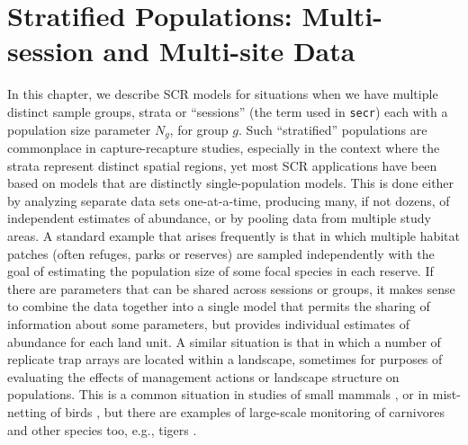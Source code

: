 \chapter{Stratified Populations:
Multi-session and Multi-site Data}
\label{chapt.hscr}

\vspace{0.3cm}


In this chapter, we describe SCR models for situations when we have
multiple distinct sample groups, strata or ``sessions'' (the term used
in \mbox{\tt secr}) each with a population size parameter $N_{g}$, for
group $g$.
Such ``stratified'' populations are commonplace in capture-recapture
studies, especially in the context where the strata represent
distinct spatial regions, yet most SCR applications have been based
 on models that are distinctly single-population models. This is done
 either by analyzing separate data sets one-at-a-time, producing many,
 if not dozens, of independent estimates of abundance, or by pooling
 data from multiple study areas.  A standard example that arises
frequently is that in which multiple habitat patches (often refuges,
parks or reserves) are sampled independently with the goal of
estimating the population size of some focal species in each
reserve. If there are parameters that can be shared across sessions or
groups, it makes sense to 
combine the data together into a single model that permits the
sharing of information about some parameters, but provides individual
estimates of abundance for each land unit.  
A similar situation is that in which a number of replicate trap arrays
are located within a landscape, sometimes for purposes of evaluating
the effects of management actions or landscape structure on
populations. This is a common situation in studies of small mammals
\citep{converse_etal:2006jwm, converse_etal:2006ea,
  converse_royle:2012}, or in mist-netting of birds
\citep{desante_etal:1995}, but there are examples of large-scale
monitoring of carnivores and other species too, e.g., tigers
\citep{jhala_etal:2011}.

